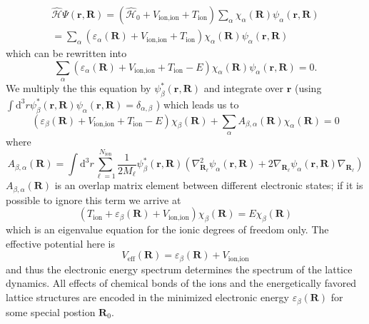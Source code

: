\documentclass[11pt]{book}
\renewcommand{\vec}[1]{\bm{#1}}
\renewcommand{\H}{\hat{\mathcal{H}}}
\newcommand{\ion}{\text{ion}}
\newcommand{\eff}{\text{eff}}
\newcommand{\intdV}{\int \text{d}^3 r}
\begin{document}
\begin{eqnarray}
  \H \Psi \left( \vec{r}, \vec{R} \right) = \left(\H_0 + V_{\ion, \ion} + T_{\ion} \right) \sum_{\alpha} \chi_{\alpha}\left( \vec{R} \right) \psi_{\alpha} \left( \vec{r}, \vec{R} \right) \\ 
  = \sum_{\alpha} \left( \varepsilon_{\alpha}\left( \vec{R} \right) + V_{\ion, \ion} + T_{\ion} \right)\chi_{\alpha}\left( \vec{R} \right) \psi_{\alpha} \left( \vec{r}, \vec{R} \right)
\end{eqnarray}
which can be rewritten into 
\begin{equation}
  \sum_{\alpha} \left( \varepsilon_{\alpha}\left( \vec{R} \right) + V_{\ion,\ion} + T_{\ion} - E \right)\chi_{\alpha}\left( \vec{R} \right) \psi_{\alpha} \left( \vec{r}, \vec{R} \right) = 0.
\end{equation}
We multiply the this equation by $ \psi_{\beta}^* \left( \vec{r}, \vec{R} \right) $  and integrate over $ \vec{r} $ (using $ \intdV  \psi_{\beta}^* \left( \vec{r}, \vec{R} \right) \psi_{\alpha} \left( \vec{r}, \vec{R} \right) = \delta_{\alpha, \beta}$ ) which leads us to 
\begin{equation}
  \left( \varepsilon_{\beta}\left( \vec{R}\right) + V_{\ion, \ion} + T_{\ion} -E \right) \chi_{\beta} \left( \vec{R} \right) + \sum_{\alpha} A_{ \beta, \alpha}\left( \vec{R} \right) \chi_{\alpha}\left( \vec{R} \right) = 0
\end{equation}
where 
\begin{equation}
  A_{ \beta, \alpha}\left( \vec{R} \right) = \intdV \sum_{\ell=1}^{N_{\ion}} \frac{1}{2M_{\ell}} \psi_{\beta}^* \left( \vec{r}, \vec{R} \right) \left( \nabla^2_{\vec{R}_{\ell}}\psi_{\alpha} \left( \vec{r}, \vec{R} \right) + 2 \nabla_{\vec{R}_{\ell}}\psi_{\alpha} \left( \vec{r}, \vec{R} \right)\nabla_{\vec{R}_{\ell}} \right)
\end{equation}
$ A_{ \beta, \alpha}\left( \vec{R} \right) $ is an overlap matrix element between different electronic states; if it is possible to ignore this term we arrive at 
\begin{equation}
  \left( T_{\ion} + \varepsilon_{\beta}\left( \vec{R} \right) +V_{\ion,\ion}\right) \chi_{\beta} \left( \vec{R} \right) = E \chi_{\beta} \left( \vec{R} \right)
\end{equation}
which is an eigenvalue equation for the ionic degrees of freedom only. The effective potential here is 
\begin{equation}
  V_{\eff} \left( \vec{R} \right) = \varepsilon_{\beta} \left( \vec{R} \right) + V_{\ion,\ion}
\end{equation}
and thus the electronic energy spectrum determines the spectrum of the lattice dynamics. All effects of chemical bonds of the ions and the energetically favored lattice structures are encoded in the minimized electronic energy $ \varepsilon_{\beta}\left( \vec{R} \right) $ for some special postion $ \vec{R}_0 $. 
\end{document}
